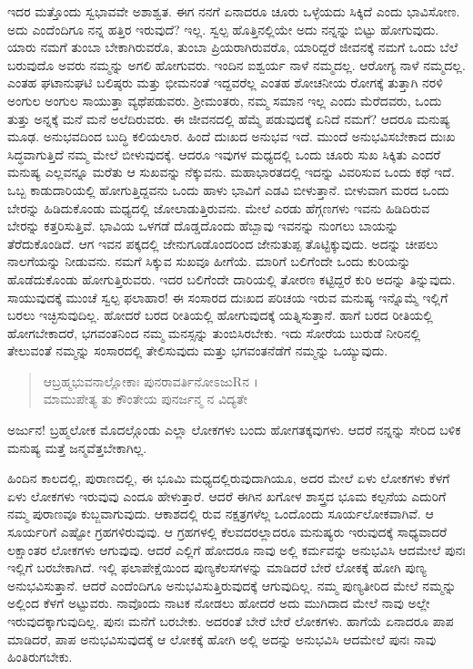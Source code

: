 ಇದರ ಮತ್ತೊಂದು ಸ್ವಭಾವವೇ ಅಶಾಶ್ವತ. ಈಗ ನನಗೆ ಏನಾದರೂ ಚೂರು ಒಳ್ಳೆಯದು ಸಿಕ್ಕಿದೆ ಎಂದು ಭಾವಿಸೋಣ. ಅದು ಎಂದೆಂದಿಗೂ ನನ್ನ ಹತ್ತಿರ ಇರುವುದೆ? ಇಲ್ಲ. ಸ್ವಲ್ಪ ಹೊತ್ತಿನಲ್ಲಿಯೇ ಅದು ನನ್ನನ್ನು ಬಿಟ್ಟು ಹೋಗುವುದು. ಯಾರು ನಮಗೆ ತುಂಬಾ ಬೇಕಾಗಿರುವರೊ, ತುಂಬಾ ಪ್ರಿಯರಾಗಿರುವರೊ, ಯಾರಿದ್ದರೆ ಜೀವನಕ್ಕೆ ನಮಗೆ ಒಂದು ಬೆಲೆ ಬರುವುದೊ ಅವರು ನಮ್ಮನ್ನು ಅಗಲಿ ಹೋಗುವರು. ಇಂದಿನ ಐಶ್ವರ್ಯ ನಾಳೆ ನಮ್ಮದಲ್ಲ. ಆರೋಗ್ಯ ನಾಳೆ ನಮ್ಮದಲ್ಲ. ಎಂತಹ ಘಟಾನುಘಟಿ ಬಲಿಷ್ಠರು ಮತ್ತು ಭೀಮನಂತೆ ಇದ್ದವರೆಲ್ಲ ಎಂತಹ ಶೋಚನೀಯ ರೋಗಕ್ಕೆ ತುತ್ತಾಗಿ ನರಳಿ ಅಂಗುಲ ಅಂಗುಲ ಸಾಯುತ್ತಾ ವ್ಯಥೆಪಡುವರು. ಶ್ರೀಮಂತರು, ನಮ್ಮ ಸಮಾನ ಇಲ್ಲ ಎಂದು ಮೆರೆದವರು, ಒಂದು ತುತ್ತು ಅನ್ನಕ್ಕೆ ಮನೆ ಮನೆ ಅಲೆದಿರುವರು. ಈ ಜೀವನದಲ್ಲಿ ಹೆಮ್ಮೆ ಪಡುವುದಕ್ಕೆ ಏನಿದೆ ನಮಗೆ? ಆದರೂ ಮನುಷ್ಯ ಮೂಢ. ಅನುಭವದಿಂದ ಬುದ್ಧಿ ಕಲಿಯಲಾರ. ಹಿಂದೆ ದುಃಖದ ಅನುಭವ ಇದೆ. ಮುಂದೆ ಅನುಭವಿಸಬೇಕಾದ ದುಃಖ ಸಿದ್ಧವಾಗುತ್ತಿದೆ ನಮ್ಮ ಮೇಲೆ ಬೀಳುವುದಕ್ಕೆ. ಆದರೂ ಇವುಗಳ ಮಧ್ಯದಲ್ಲಿ ಒಂದು ಚೂರು ಸುಖ ಸಿಕ್ಕಿತು ಎಂದರೆ ಮನುಷ್ಯ ಎಲ್ಲವನ್ನೂ ಮರೆತು ಆ ಸುಖವನ್ನು ನೆಕ್ಕುವನು. ಮಹಾಭಾರತದಲ್ಲಿ ಇದನ್ನು ವಿವರಿಸುವ ಒಂದು ಕಥೆ ಇದೆ. ಒಬ್ಬ ಕಾಡುದಾರಿಯಲ್ಲಿ ಹೋಗುತ್ತಿದ್ದವನು ಒಂದು ಹಾಳು ಭಾವಿಗೆ ಎಡವಿ ಬೀಳುತ್ತಾನೆ. ಬೀಳುವಾಗ ಮರದ ಒಂದು ಬೇರನ್ನು ಹಿಡಿದುಕೊಂಡು ಮಧ್ಯದಲ್ಲಿ ಜೋಲಾಡುತ್ತಿರುವನು. ಮೇಲೆ ಎರಡು ಹೆಗ್ಗಣಗಳು ಇವನು ಹಿಡಿದಿರುವ ಬೇರನ್ನು ಕತ್ತರಿಸುತ್ತಿವೆ. ಭಾವಿಯ ಒಳಗಡೆ ದೊಡ್ಡದೊಂದು ಹೆಬ್ಬಾವು ಇವನನ್ನು ನುಂಗಲು ಬಾಯನ್ನು ತೆರೆದುಕೊಂಡಿದೆ. ಆಗ ಇವನ ಪಕ್ಕದಲ್ಲಿ ಜೇನುಗೂಡೊಂದರಿಂದ ಜೇನುತುಪ್ಪ ತೊಟ್ಟಿಕ್ಕುವುದು. ಅದನ್ನು ಚೀಪಲು ನಾಲಗೆಯನ್ನು ನೀಡುವನು. ನಮಗೆ ಸಿಕ್ಕುವ ಸುಖವೂ ಹೀಗೆಯೆ. ಮಾರಿಗೆ ಬಲಿಗೆಂದೇ ಒಂದು ಕುರಿಯನ್ನು ಹೊಡೆದುಕೊಂಡು ಹೋಗುತ್ತಿರುವರು. ಇದರ ಬಲಿಗೆಂದೇ ದಾರಿಯಲ್ಲಿ ತೋರಣ ಕಟ್ಟಿದ್ದರೆ ಕುರಿ ಅದನ್ನು ತಿನ್ನುವುದು. ಸಾಯುವುದಕ್ಕೆ ಮುಂಚೆ ಸ್ವಲ್ಪ ಫಲಾಹಾರ! ಈ ಸಂಸಾರದ ದುಃಖದ ಪರಿಚಯ ಇರುವ ಮನುಷ್ಯ ಇನ್ನೊಮ್ಮೆ ಇಲ್ಲಿಗೆ ಬರಲು ಇಚ್ಛಿಸುವುದಿಲ್ಲ. ಹೋದರೆ ಬರದ ರೀತಿಯಲ್ಲಿ ಹೋಗುವುದಕ್ಕೆ ಯತ್ನಿಸುತ್ತಾನೆ. ಹಾಗೆ ಬರದ ರೀತಿಯಲ್ಲಿ ಹೋಗಬೇಕಾದರೆ, ಭಗವಂತನಿಂದ ನಮ್ಮ ಮನಸ್ಸನ್ನು ತುಂಬಿಸಿರಬೇಕು. ಇದು ಸೋರೆಯ ಬುರುಡೆ ನೀರಿನಲ್ಲಿ ತೇಲುವಂತೆ ನಮ್ಮನ್ನು ಸಂಸಾರದಲ್ಲಿ ತೇಲಿಸುವುದು ಮತ್ತು ಭಗವಂತನೆಡೆಗೆ ನಮ್ಮನ್ನು ಒಯ್ಯುವುದು.

\begin{verse}
ಆಬ್ರಹ್ಮಭುವನಾಲ್ಲೋಕಾಃ ಪುನರಾವರ್ತಿನೋಽಜುRನ ।\\ಮಾಮುಪೇತ್ಯ ತು ಕೌಂತೇಯ ಪುನರ್ಜನ್ಮ ನ ವಿದ್ಯತೇ 
\end{verse}

{\small ಅರ್ಜುನ! ಬ್ರಹ್ಮಲೋಕ ಮೊದಲ್ಗೊಂಡು ಎಲ್ಲಾ ಲೋಕಗಳು ಬಂದು ಹೋಗತಕ್ಕವುಗಳು. ಆದರೆ ನನ್ನನ್ನು ಸೇರಿದ ಬಳಿಕ ಮನುಷ್ಯ ಮತ್ತೆ ಜನ್ಮವೆತ್ತಬೇಕಾಗಿಲ್ಲ.}

ಹಿಂದಿನ ಕಾಲದಲ್ಲಿ, ಪುರಾಣದಲ್ಲಿ, ಈ ಭೂಮಿ ಮಧ್ಯದಲ್ಲಿರುವುದಾಗಿಯೂ, ಅದರ ಮೇಲೆ ಏಳು ಲೋಕಗಳು ಕೆಳಗೆ ಏಳು ಲೋಕಗಳು ಇರುವುವು ಎಂದೂ ಹೇಳುತ್ತಾರೆ. ಆದರೆ ಈಗಿನ ಖಗೋಳ ಶಾಸ್ತ್ರದ ಭೂಮ ಕಲ್ಪನೆಯ ಎದುರಿಗೆ ನಮ್ಮ ಪುರಾಣವೂ ಕುಬ್ಜವಾಗುವುದು. ಆಕಾಶದಲ್ಲಿ ರುವ ನಕ್ಷತ್ರಗಳೆಲ್ಲ ಒಂದೊಂದು ಸೂರ್ಯಲೋಕವಾಗಿವೆ. ಆ ಸೂರ್ಯರಿಗೆ ಎಷ್ಟೋ ಗ್ರಹಗಳಿರುವುವು. ಆ ಗ್ರಹಗಳಲ್ಲಿ ಕೆಲವದರಲ್ಲಾದರೂ ಮನುಷ್ಯರು ಇರುವುದಕ್ಕೆ ಸಾಧ್ಯವಾದರೆ ಲಕ್ಷಾಂತರ ಲೋಕಗಳು ಆಗುವುವು. ಆದರೆ ಎಲ್ಲಿಗೆ ಹೋದರೂ ನಾವು ಅಲ್ಲಿ ಕರ್ಮವನ್ನು ಅನುಭವಿಸಿ ಆದಮೇಲೆ ಪುನಃ ಇಲ್ಲಿಗೆ ಬರಬೇಕಾಗಿದೆ. ಇಲ್ಲಿ ಫಲಾಪೇಕ್ಷೆಯಿಂದ ಪುಣ್ಯಕೆಲಸಗಳನ್ನು ಮಾಡಿದರೆ ಬೇರೆ ಲೋಕಕ್ಕೆ ಹೋಗಿ ಪುಣ್ಯ ಅನುಭವಿಸುತ್ತಾನೆ. ಆದರೆ ಎಂದೆಂದಿಗೂ ಅನುಭವಿಸುತ್ತಿರುವುದಕ್ಕೆ ಆಗುವುದಿಲ್ಲ. ನಮ್ಮ ಪುಣ್ಯತೀರಿದ ಮೇಲೆ ನಮ್ಮನ್ನು ಅಲ್ಲಿಂದ ಕೆಳಗೆ ಅಟ್ಟುವರು. ನಾವೊಂದು ನಾಟಕ ನೋಡಲು ಹೋದರೆ ಅದು ಮುಗಿದಾದ ಮೇಲೆ ನಾವು ಅಲ್ಲೇ ಇರುವುದಕ್ಕಾಗುವುದಿಲ್ಲ. ಪುನಃ ಮನೆಗೆ ಬರಬೇಕು. ಅದರಂತೆ ಬೇರೆ ಬೇರೆ ಲೋಕಗಳು. ಹಾಗೆಯೆ ಏನಾದರೂ ಪಾಪ ಮಾಡಿದರೆ, ಪಾಪ ಅನುಭವಿಸುವುದಕ್ಕೆ ಆ ಲೋಕಕ್ಕೆ ಹೋಗಿ ಅಲ್ಲಿ ಅದನ್ನು ಅನುಭವಿಸಿ ಆದಮೇಲೆ ಪುನಃ ನಾವು ಹಿಂತಿರುಗಬೇಕು.

